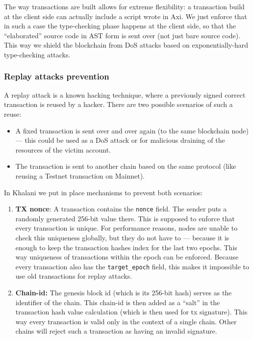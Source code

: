 \documentclass[a4paper]{article}
\newcommand{\code}[1]{{\small \texttt{#1}}}
\begin{document}
The way transactions are built allows for extreme flexibility: a transaction build at the client side can actually include a script wrote in Axi. We just enforce that in such a case the type-checking phase happens at the client side, so that the ``elaborated'' source code in AST form is sent over (not just bare source code). This way we shield the blockchain from DoS attacks based on exponentially-hard type-checking attacks.

\subsubsection{Replay attacks prevention}

A replay attack is a known hacking technique, where a previously signed correct transaction is reused by a hacker. There are two possible scenarios of such a reuse:

\begin{itemize}
  \item A fixed transaction is sent over and over again (to the same blockchain node) --- this could be used as a DoS attack or for malicious draining of the resources of the victim account.
  \item The transaction is sent to another chain based on the same protocol (like reusing a Testnet transaction on Mainnet).
\end{itemize}

In Khalani we put in place mechanisms to prevent both scenarios:

\begin{enumerate}
  \item \textbf{TX nonce}: A transaction contains the \code{nonce} field. The sender puts a randomly generated 256-bit value there. This is supposed to enforce that every transaction is unique. For performance reasons, nodes are unable to check this uniqueness globally, but they do not have to --- because it is enough to keep the transaction hashes index for the last two epochs. This way uniqueness of transactions within the epoch can be enforced. Because every transaction also has the \code{target\_epoch} field, this makes it impossible to use old transactions for replay attacks.
  \item \textbf{Chain-id:} The genesis block id (which is its 256-bit hash) serves as the identifier of the chain. This chain-id is then added as a ``salt'' in the transaction hash value calculation (which is then used for tx signature). This way every transaction is valid only in the context of a single chain. Other chains will reject such a transaction as having an invalid signature.
\end{enumerate}
\end{document}
